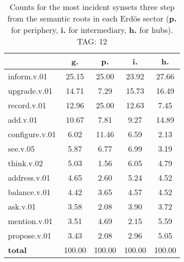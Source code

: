 \begin{table}[h!]
\begin{center}
\begin{tabular}{| l | c | c | c | c |}\hline
 & g. & p. & i. & h. \\\hline
inform.v.01 & 25.15  & 25.00  & 23.92  & 27.66 \\\hline
upgrade.v.01 & 14.71  & 7.29  & 15.73  & 16.49 \\\hline
record.v.01 & 12.96  & 25.00  & 12.63  & 7.45 \\\hline
add.v.01 & 10.67  & 7.81  & 9.27  & 14.89 \\\hline
configure.v.01 & 6.02  & 11.46  & 6.59  & 2.13 \\\hline
see.v.05 & 5.87  & 6.77  & 6.99  & 3.19 \\\hline
think.v.02 & 5.03  & 1.56  & 6.05  & 4.79 \\\hline
address.v.01 & 4.65  & 2.60  & 5.24  & 4.52 \\\hline
balance.v.01 & 4.42  & 3.65  & 4.57  & 4.52 \\\hline
ask.v.01 & 3.58  & 2.08  & 3.90  & 3.72 \\\hline
mention.v.01 & 3.51  & 4.69  & 2.15  & 5.59 \\\hline
propose.v.01 & 3.43  & 2.08  & 2.96  & 5.05 \\\hline
{{\bf total}} & 100.00  & 100.00  & 100.00  & 100.00 \\\hline
\end{tabular}
\caption{Counts for the most incident synsets three step from the semantic roots in each Erd\"os sector ({\bf p.} for periphery, {\bf i.} for intermediary, {\bf h.} for hubs). TAG: 12}
\end{center}
\end{table}